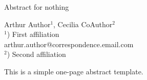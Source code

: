 \documentclass[a4paper]{article}
\begin{document}
\Large
 \begin{center}
Abstract for nothing\\ 

\hspace{10pt}

\large
Arthur Author$^1$, Cecilia CoAuthor$^2$ \\
\hspace{10pt}
\small  
$^1$) First affiliation\\
arthur.author@correspondence.email.com\\
$^2$) Second affiliation
\end{center} %

\hspace{10pt}
\normalsize
This is a simple one-page abstract template.
\end{document}
